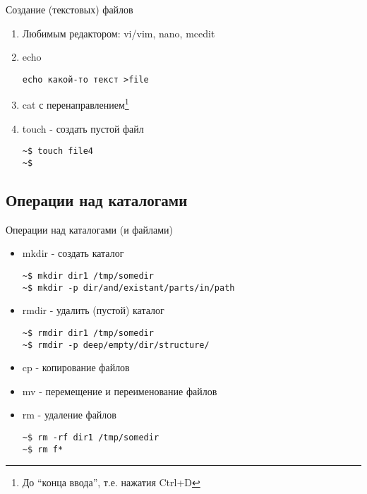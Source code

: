 \begin{frame}[fragile]{Создание (текстовых) файлов}
  \pause
  \begin{enumerate}
    \item Любимым редактором: \alert{vi/vim}, \alert{nano}, \alert{mcedit} \pause
    \item \alert{echo}
\begin{lstlisting}
echo какой-то текст >file
\end{lstlisting}\pause
    \item \alert{cat} с перенаправлением\footnote{До ``конца ввода'', т.е. нажатия Ctrl+D}
 \pause
    \item \alert{touch} - создать пустой файл
\begin{lstlisting}
~$ touch file4
~$
\end{lstlisting}
  \end{enumerate}
\end{frame}

\subsection{Операции над каталогами}

\begin{frame}[fragile]{Операции над каталогами (и файлами)}
  \begin{itemize}
    \item \alert{mkdir} - создать каталог
\begin{lstlisting}
~$ mkdir dir1 /tmp/somedir
~$ mkdir -p dir/and/existant/parts/in/path
\end{lstlisting} \pause
    \item \alert{rmdir} - удалить (пустой) каталог
\begin{lstlisting}
~$ rmdir dir1 /tmp/somedir
~$ rmdir -p deep/empty/dir/structure/
\end{lstlisting} \pause
    \item \alert{cp} - копирование файлов\footnotemark[8]
    \item \alert{mv} - перемещение и переименование файлов
    \item \alert{rm} - удаление файлов\footnotemark[17] 
\begin{lstlisting}
~$ rm -rf dir1 /tmp/somedir
~$ rm f*
\end{lstlisting} \pause
  \end{itemize}
\end{frame}



